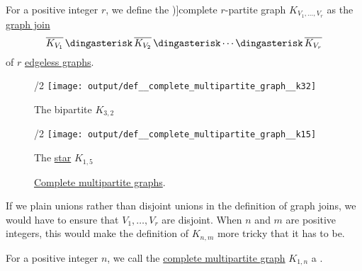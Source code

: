 \begin{definition}\label{def:complete_multipartite_graph}
  For a positive integer \( r \), we define the \term[ru=полный \( r \)-дольный (граф) (\cite[\S 1]{ЕмеличевИПр1990Графы})]{complete \( r \)-partite} graph \( K_{V_1,\ldots,V_r} \) as the \hyperref[def:graph_join]{graph join}
  \begin{equation*}
    \oline{K_{V_1}} \Ast \oline{K_{V_2}} \Ast \cdots \Ast \oline{K_{V_r}}
  \end{equation*}
  of \( r \) \hyperref[def:edgeless_graph]{edgeless graphs}.

  \begin{figure}[!ht]
    \begin{subcaptionblock}{\textwidth/2}
      \centering
      \texttt{[image: output/def\_\_complete\_multipartite\_graph\_\_k32]}
      \caption{The bipartite \( K_{3,2} \)}\label{fig:def:complete_multipartite_graph/k32}
    \end{subcaptionblock}
    \hfill
    \begin{subcaptionblock}{\textwidth/2}
      \centering
      \texttt{[image: output/def\_\_complete\_multipartite\_graph\_\_k15]}
      \caption{The \hyperref[def:star_graph]{star} \( K_{1,5} \)}\label{fig:def:complete_multipartite_graph/k15}
    \end{subcaptionblock}
    \caption{\hyperref[def:complete_multipartite_graph]{Complete multipartite graphs}.}\label{fig:def:complete_multipartite_graph}
  \end{figure}
\end{definition}
\begin{comments}
  \item If we plain unions rather than disjoint unions in the definition of graph joins, we would have to ensure that \( V_1, \ldots, V_r \) are disjoint. When \( n \) and \( m \) are positive integers, this would make the definition of \( K_{n,m} \) more tricky that it has to be.
\end{comments}

\begin{definition}\label{def:star_graph}
  For a positive integer \( n \), we call the \hyperref[def:complete_multipartite_graph]{complete multipartite graph} \( K_{1,n} \) a .
\end{definition}

